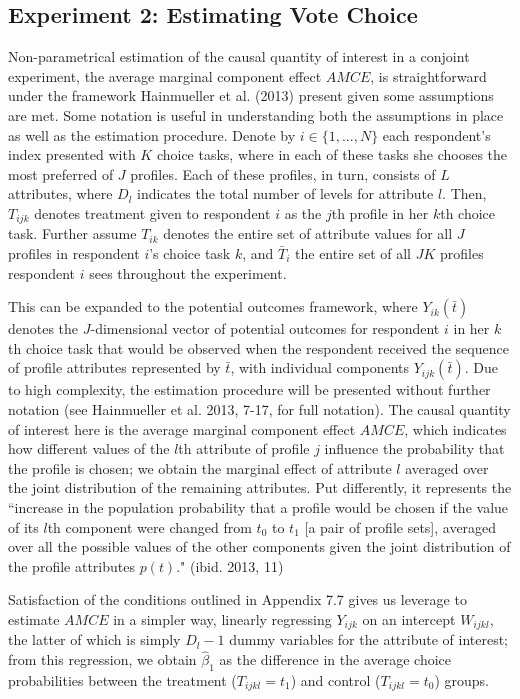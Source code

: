 \documentclass[11pt]{article}
\begin{document}
\subsection{Experiment 2: Estimating Vote Choice}
Non-parametrical estimation of the causal quantity of interest in a conjoint experiment, the average marginal component effect $AMCE$, is straightforward under the framework Hainmueller et al. (2013) present given some assumptions are met. Some notation is useful in understanding both the assumptions in place as well as the estimation procedure. Denote by $i \in \{1,...,N\}$ each respondent's index presented with $K$ choice tasks, where in each of these tasks she chooses the most preferred of $J$ profiles. Each of these profiles, in turn, consists of $L$ attributes, where $D_l$ indicates the total number of levels for attribute $l$. Then, $T_{ijk}$ denotes treatment given to respondent $i$ as the $j$th profile in her $k$th choice task. Further assume $T_{ik}$ denotes the entire set of attribute values for all $J$ profiles in respondent $i$'s choice task $k$, and $\bar{T}_i$ the entire set of all $JK$ profiles respondent $i$ sees throughout the experiment.

This can be expanded to the potential outcomes framework, where $Y_{ik}(\bar{t})$ denotes the $J$-dimensional vector of potential outcomes for respondent $i$ in her $k$th choice task that would be observed when the respondent received the sequence of profile attributes represented by $\bar{t}$, with individual components $Y_{ijk}(\bar{t})$. Due to high complexity, the estimation procedure will be presented without further notation (see Hainmueller et al. 2013, 7-17, for full notation). The causal quantity of interest here is the average marginal component effect $AMCE$, which indicates how different values of the $l$th attribute of profile $j$ influence the probability that the profile is chosen; we obtain the marginal effect of attribute $l$ averaged over the joint distribution of the remaining attributes. Put differently, it represents the “increase in the population probability that a profile would be chosen if the value of its $l$th component were changed from $t_0$ to $t_1$ [a pair of profile sets], averaged over all the possible values of the other components given the joint distribution of the profile attributes $p(t)$." (ibid. 2013, 11)

Satisfaction of the conditions outlined in Appendix 7.7 gives us leverage to estimate $AMCE$ in a simpler way, linearly regressing $Y_{ijk}$ on an intercept $W_{ijkl}$, the latter of which is simply $D_l - 1$ dummy variables for the attribute of interest; from this regression, we obtain $\hat{\beta}_1$ as the difference in the average choice probabilities between the treatment ($T_{ijkl} = t_1$) and control ($T_{ijkl} = t_0$) groups.
\end{document}

